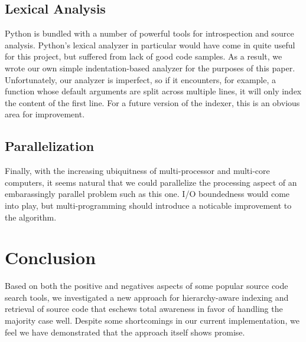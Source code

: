 \documentclass{article}
\begin{document}
\subsection{Lexical Analysis}
Python is bundled with a number of powerful tools for introspection and source analysis. Python's lexical analyzer in particular would have come in quite useful for this project, but suffered from lack of good code samples. As a result, we wrote our own simple indentation-based analyzer for the purposes of this paper.
Unfortunately, our analyzer is imperfect, so if it encounters, for example, a function whose default arguments are split across multiple lines, it will only index the content of the first line. For a future version of the indexer, this is an obvious area for improvement.

\subsection{Parallelization}
Finally, with the increasing ubiquitness of multi-processor and multi-core computers, it seems natural that we could parallelize the processing aspect of an embarassingly parallel problem such as this one. I/O boundedness would come into play, but multi-programming should introduce a noticable improvement to the algorithm.

\section{Conclusion}
Based on both the positive and negatives aspects of some popular source code search tools, we investigated a new approach for hierarchy-aware indexing and retrieval of source code that eschews total awareness in favor of handling the majority case well. Despite some shortcomings in our current implementation, we feel we have demonstrated that the approach itself shows promise.

\newpage

\end{document}
